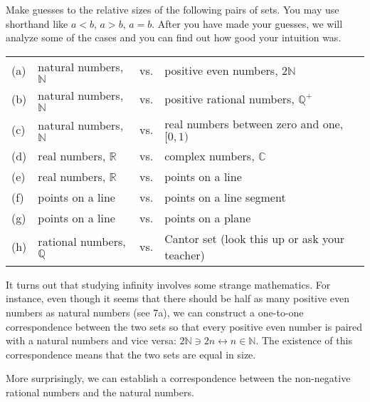 \documentclass[../gatm.tex]{subfiles}
\begin{document}
Make guesses to the relative sizes of the following pairs of sets. You may use shorthand like $a < b$, $a > b$, $a = b$. After you have made your guesses, we will analyze some of the cases and you can find out how good your intuition was.

\begin{tabular}{llll}
(a) & natural numbers, $\mathbb{N}$ & vs. & positive even numbers, $2\mathbb{N}$ \\
(b) & natural numbers, $\mathbb{N}$ & vs. & positive rational numbers, $\mathbb{Q}^+$ \\
(c) & natural numbers, $\mathbb{N}$ & vs. & real numbers between zero and one, $[0,1)$ \\
(d) & real numbers, $\mathbb{R}$ & vs. & complex numbers, $\mathbb{C}$ \\
(e) & real numbers, $\mathbb{R}$ & vs. & points on a line \\
(f) & points on a line & vs. & points on a line segment \\
(g) & points on a line & vs. & points on a plane \\
(h) & rational numbers, $\mathbb{Q}$ & vs. & Cantor set (look this up or ask your teacher) \\
\end{tabular}

It turns out that studying infinity involves some strange mathematics. For instance, even though it seems that there should be half as many positive even numbers as natural numbers (see 7a), we can construct a one-to-one correspondence between the two sets so that every positive even number is paired with a natural numbers and vice versa: $2\mathbb{N} \ni 2n \leftrightarrow n \in \mathbb{N}$. The existence of this correspondence means that the two sets are equal in size.

More surprisingly, we can establish a correspondence between the non-negative rational numbers and the natural numbers. 
\end{document}
